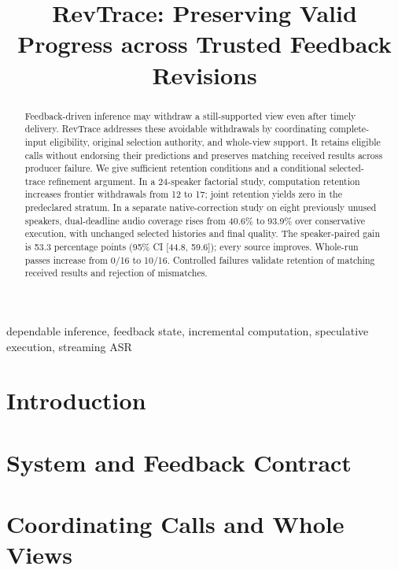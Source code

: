 \documentclass[conference,10pt]{IEEEtran}
\begin{document}
\title{RevTrace: Preserving Valid Progress across Trusted Feedback Revisions}
\author{}
\maketitle
\begin{abstract}
Feedback-driven inference may withdraw a still-supported view even after
timely delivery. RevTrace addresses these avoidable withdrawals by
coordinating complete-input eligibility, original selection authority,
and whole-view support. It retains eligible calls without endorsing their
predictions and preserves matching received results across producer
failure. We give sufficient retention conditions and a conditional
selected-trace refinement argument. In a 24-speaker factorial study,
computation retention increases frontier withdrawals from 12 to 17;
joint retention yields zero in the predeclared stratum. In a separate
native-correction study on eight previously unused speakers,
dual-deadline audio coverage rises from 40.6\% to 93.9\% over conservative
execution, with unchanged selected histories and final quality.
The speaker-paired gain is 53.3 percentage points (95\% CI [44.8, 59.6]);
every source improves. Whole-run passes increase from 0/16 to 10/16.
Controlled failures validate retention of matching received results and
rejection of mismatches.
\end{abstract}
\begin{IEEEkeywords}
dependable inference, feedback state, incremental computation, speculative execution, streaming ASR
\end{IEEEkeywords}
\section{Introduction}\label{sec:intro}

\section{System and Feedback Contract}\label{sec:contract}

\section{Coordinating Calls and Whole Views}\label{sec:continuation}





\end{document}
